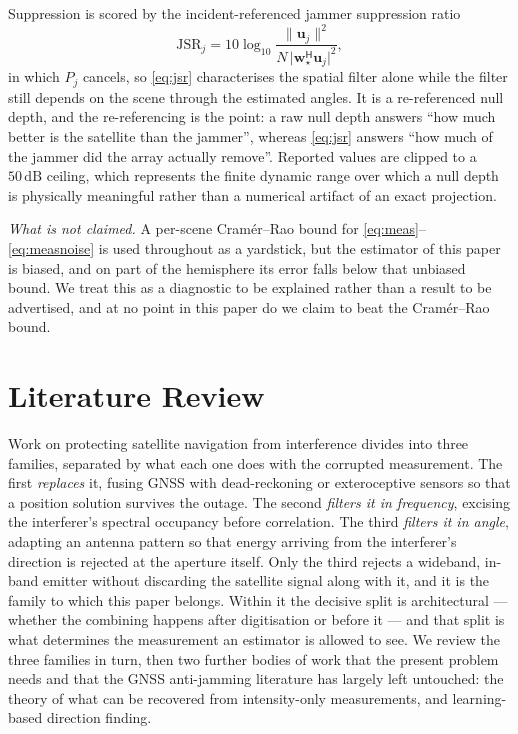 \documentclass[journal]{IEEEtran}
\newcommand{\uv}{\mathbf{u}}
\newcommand{\wv}{\mathbf{w}}
\newcommand{\JSR}{\mathrm{JSR}}
\newcommand{\Herm}{\mathsf{H}}
\newcommand{\dB}{\,\mathrm{dB}}
\begin{document}
Suppression is scored by the incident-referenced jammer suppression ratio
\begin{equation}
\JSR_j = 10\log_{10}
\frac{\|\uv_j\|^2}{N\,\big|\wv_{\star}^{\Herm}\uv_j\big|^2} ,
\label{eq:jsr}
\end{equation}
in which $P_j$ cancels, so \eqref{eq:jsr} characterises the spatial filter
alone while the filter still depends on the scene through the estimated
angles. It is a re-referenced null depth, and the re-referencing is the point:
a raw null depth answers ``how much better is the satellite than the jammer'',
whereas \eqref{eq:jsr} answers ``how much of the jammer did the array actually
remove''. Reported values are clipped to a $50\dB$ ceiling, which represents
the finite dynamic range over which a null depth is physically meaningful
rather than a numerical artifact of an exact projection.

\emph{What is not claimed.} A per-scene Cram\'er--Rao bound for
\eqref{eq:meas}--\eqref{eq:measnoise} is used throughout as a yardstick, but
the estimator of this paper is biased, and on part of the hemisphere its error
falls below that unbiased bound. We treat this as a diagnostic to be explained
rather than a result to be advertised, and at no point in this paper do we
claim to beat the Cram\'er--Rao bound.

\section{Literature Review}
\label{sec:lit}

Work on protecting satellite navigation from interference divides into three
families, separated by what each one does with the corrupted measurement. The
first \emph{replaces} it, fusing GNSS with dead-reckoning or exteroceptive
sensors so that a position solution survives the outage. The second
\emph{filters it in frequency}, excising the interferer's spectral occupancy
before correlation. The third \emph{filters it in angle}, adapting an antenna
pattern so that energy arriving from the interferer's direction is rejected at
the aperture itself. Only the third rejects a wideband, in-band emitter without
discarding the satellite signal along with it, and it is the family to which
this paper belongs. Within it the decisive split is architectural --- whether
the combining happens after digitisation or before it --- and that split is what
determines the measurement an estimator is allowed to see. We review the three
families in turn, then two further bodies of work that the present problem
needs and that the GNSS anti-jamming literature has largely left untouched:
the theory of what can be recovered from intensity-only measurements, and
learning-based direction finding.
\end{document}
